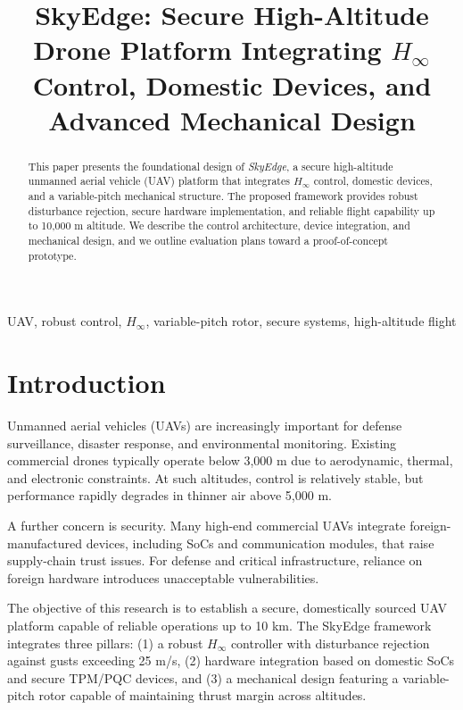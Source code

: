 \documentclass[conference]{IEEEtran}
\title{SkyEdge: Secure High-Altitude Drone Platform Integrating $H_\infty$ Control, Domestic Devices, and Advanced Mechanical Design}
\author{
\IEEEauthorblockN{Shinichi Samizo}
\IEEEauthorblockA{Independent Semiconductor Researcher \\
Project Design Hub, Samizo-AITL \\
\textit{Email:} \href{mailto:shin3t72@gmail.com}{shin3t72@gmail.com} \\
\textit{GitHub:} \href{https://github.com/Samizo-AITL}{Samizo-AITL}}
}
\begin{document}
\maketitle

\begin{abstract}
This paper presents the foundational design of \emph{SkyEdge}, 
a secure high-altitude unmanned aerial vehicle (UAV) platform that 
integrates $H_\infty$ control, domestic devices, and a variable-pitch 
mechanical structure. The proposed framework provides robust disturbance 
rejection, secure hardware implementation, and reliable flight capability 
up to 10{,}000 m altitude. We describe the control architecture, device 
integration, and mechanical design, and we outline evaluation plans 
toward a proof-of-concept prototype.
\end{abstract}

\begin{IEEEkeywords}
UAV, robust control, $H_\infty$, variable-pitch rotor, secure systems, high-altitude flight
\end{IEEEkeywords}

\section{Introduction}
Unmanned aerial vehicles (UAVs) are increasingly important for defense surveillance, disaster response, and environmental monitoring. Existing commercial drones typically operate below 3{,}000 m due to aerodynamic, thermal, and electronic constraints. At such altitudes, control is relatively stable, but performance rapidly degrades in thinner air above 5{,}000 m.  

A further concern is security. Many high-end commercial UAVs integrate foreign-manufactured devices, including SoCs and communication modules, that raise supply-chain trust issues. For defense and critical infrastructure, reliance on foreign hardware introduces unacceptable vulnerabilities.  

The objective of this research is to establish a secure, domestically sourced UAV platform capable of reliable operations up to 10 km. The SkyEdge framework integrates three pillars:  
(1) a robust $H_\infty$ controller with disturbance rejection against gusts exceeding 25 m/s,  
(2) hardware integration based on domestic SoCs and secure TPM/PQC devices, and  
(3) a mechanical design featuring a variable-pitch rotor capable of maintaining thrust margin across altitudes.  
\end{document}
